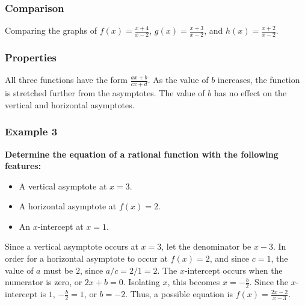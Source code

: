 \documentclass{article}
\begin{document}
\begin{center}
\end{center}

\subsubsection{Comparison}
Comparing the graphs of $f(x) = \frac{x+4}{x-2}$, $g(x) = \frac{x+3}{x-2}$, and $h(x) = \frac{x+2}{x-2}$.

\subsubsection{Properties}
All three functions have the form $\frac{ax + b}{cx + d}$. As the value of $b$ increases, the function is stretched further from the asymptotes. The value of $b$ has no effect on the vertical and horizontal asymptotes.

\subsubsection*{Example 3}
\textbf{Determine the equation of a rational function with the following features:}
\begin{itemize}
    \item A vertical asymptote at $x = 3$.
    \item A horizontal asymptote at $f(x) = 2$.
    \item An $x$-intercept at $x = 1$.
\end{itemize}
Since a vertical asymptote occurs at $x = 3$, let the denominator be $x - 3$. In order for a horizontal asymptote to occur at $f(x) = 2$, and since $c = 1$, the value of $a$ must be $2$, since $a/c = 2/1 = 2$. The $x$-intercept occurs when the numerator is zero, or $2x + b = 0$. Isolating $x$, this becomes $x = -\frac{b}{2}$. Since the $x$-intercept is $1$, $-\frac{b}{2} = 1$, or $b = -2$. Thus, a possible equation is $f(x) = \frac{2x - 2}{x - 3}$.
\end{document}
